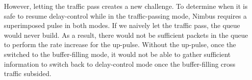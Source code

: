 However, letting the traffic pass creates a new challenge. 
To determine when it is safe to resume delay-control while in the traffic-passing mode, Nimbus requires a superimposed pulse in both modes. If we naively let the traffic pass, the \inbox queue would never build. As a result, there would not be sufficient packets in the queue to perform the rate increase for the up-pulse. 
Without the up-pulse, once the \inbox{} switched to the buffer-filling mode, it would not be able to gather sufficient information to switch back to delay-control mode once the buffer-filling cross traffic subsided.


